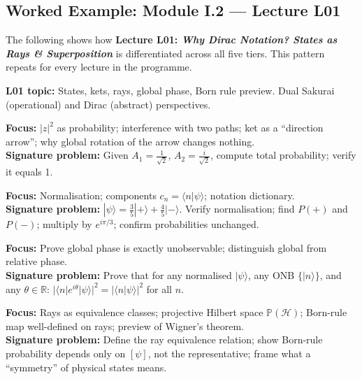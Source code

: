 \documentclass[11pt,a4paper]{article}
\begin{document}
\subsection{Worked Example: Module I.2 --- Lecture L01}

The following shows how \textbf{Lecture L01: \textit{Why Dirac Notation? States as
Rays \& Superposition}} is differentiated across all five tiers. This pattern repeats
for every lecture in the programme.

\begin{tcolorbox}[goldbox]
\textbf{L01 topic:} States, kets, rays, global phase, Born rule preview.
Dual Sakurai (operational) and Dirac (abstract) perspectives.
\end{tcolorbox}

\begin{tcolorbox}[tierbox=tier1col, title={Tier 1 (HS) --- L01}]
\textbf{Focus:} $|z|^2$ as probability; interference with two paths; ket as a
``direction arrow''; why global rotation of the arrow changes nothing.\\[4pt]
\textbf{Signature problem:} Given $A_1=\tfrac{1}{\sqrt{2}}$, $A_2=\tfrac{i}{\sqrt{2}}$,
compute total probability; verify it equals 1.
\end{tcolorbox}

\medskip
\begin{tcolorbox}[tierbox=tier2col, title={Tier 2 (BegUG) --- L01}]
\textbf{Focus:} Normalisation; components $c_n=\langle n|\psi\rangle$; notation dictionary.\\[4pt]
\textbf{Signature problem:} $|\psi\rangle=\tfrac{3}{5}|{+}\rangle+\tfrac{4}{5}|{-}\rangle$.
Verify normalisation; find $P(+)$ and $P(-)$; multiply by $e^{i\pi/3}$; confirm
probabilities unchanged.
\end{tcolorbox}

\medskip
\begin{tcolorbox}[tierbox=tier3col, title={Tier 3 (AdvUG) --- L01}]
\textbf{Focus:} Prove global phase is exactly unobservable; distinguish global from
relative phase.\\[4pt]
\textbf{Signature problem:} Prove that for any normalised $|\psi\rangle$, any ONB
$\{|n\rangle\}$, and any $\theta\in\mathbb{R}$:
$|\langle n|e^{i\theta}|\psi\rangle|^2=|\langle n|\psi\rangle|^2$ for all $n$.
\end{tcolorbox}

\medskip
\begin{tcolorbox}[tierbox=tier4col, title={Tier 4 (MSc) --- L01}]
\textbf{Focus:} Rays as equivalence classes; projective Hilbert space
$\mathbb{P}(\mathcal{H})$; Born-rule map well-defined on rays; preview of Wigner's theorem.\\[4pt]
\textbf{Signature problem:} Define the ray equivalence relation; show Born-rule probability
depends only on $[\psi]$, not the representative; frame what a ``symmetry'' of physical
states means.
\end{tcolorbox}
\end{document}
